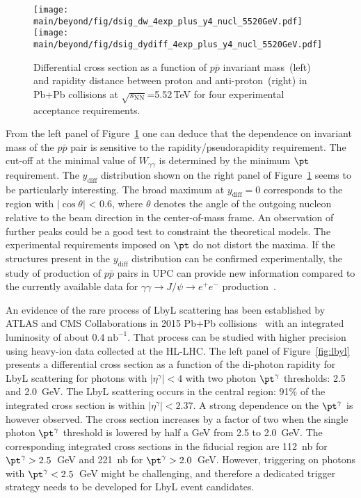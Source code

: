\begin{figure}[!h]
        \texttt{[image: \\main/beyond/fig/dsig\_dw\_4exp\_plus\_y4\_nucl\_5520GeV.pdf]}
        \texttt{[image: \\main/beyond/fig/dsig\_dydiff\_4exp\_plus\_y4\_nucl\_5520GeV.pdf]}
        \caption{
                Differential cross section as a function of $p\bar{p}$
                invariant mass~(left) and rapidity
                distance between proton and anti-proton~(right)
                in Pb+Pb collisions at $\sqrt{s_{\mathrm{NN}}}$=5.52\,TeV
                for four experimental acceptance requirements.
        }
        \label{fig:ppbar}
\end{figure}


From the left panel of Figure~\ref{fig:ppbar} one can deduce that the dependence on invariant mass of the $p\bar{p}$ pair is sensitive to the rapidity/pseudorapidity requirement. The cut-off at the minimal value of $W_{\gamma\gamma}$ is determined by the minimum $\pt$ requirement.
The $y_{\mathrm{diff}}$ distribution shown on the right panel of Figure~\ref{fig:ppbar} seems to be particularly interesting. 
The broad maximum at $y_{\mathrm{diff}}=0$ corresponds to the region with $|\cos \theta|$ < 0.6, where $\theta$ denotes the angle of the outgoing nucleon relative to the beam direction in the center-of-mass frame. An observation of further peaks could be a good test to constraint the theoretical models. The experimental requirements
imposed on $\pt$ do not distort the maxima. If the structures present in the $y_{\mathrm{diff}}$ distribution can be confirmed experimentally, the study of production of $p\bar{p}$ pairs
in UPC can provide new information compared to the currently available data for $\gamma\gamma\rightarrow J/\psi \rightarrow e^+e^-$ production~\cite{Kryshen:2017jfz,Abbas:2013oua}.


An evidence of the rare process of LbyL scattering has been established by ATLAS and CMS Collaborations in 2015 Pb+Pb collisions~\cite{Aaboud:2017bwk,Sirunyan:2018fhl} with an integrated luminosity of about $0.4\;\mathrm{nb}^{-1}$. That process can be studied with higher precision using heavy-ion data collected at the HL-LHC. The left panel of Figure~\ref{fig:lbyl} presents a differential cross section as a function of the di-photon rapidity for LbyL scattering for photons with $|\eta^\gamma|<4$ with two photon $\pt^\gamma$ thresholds: 2.5 and 2.0~GeV. The LbyL scattering occurs in the central region: 91\% of the integrated cross section is within $|\eta^\gamma|<2.37$. A strong dependence on the $\pt^\gamma$ is however observed. The cross section increases by a factor of two when the single photon $\pt^\gamma$ threshold is lowered by half a GeV from 2.5 to 2.0~GeV. The corresponding integrated cross sections in the fiducial region are 112~nb for $\pt^\gamma>2.5$~GeV and 221~nb for $\pt^\gamma>2.0$~GeV. However, triggering on photons with $\pt^\gamma<2.5$~GeV might be challenging, and therefore a dedicated trigger strategy needs to be developed for LbyL event candidates.

